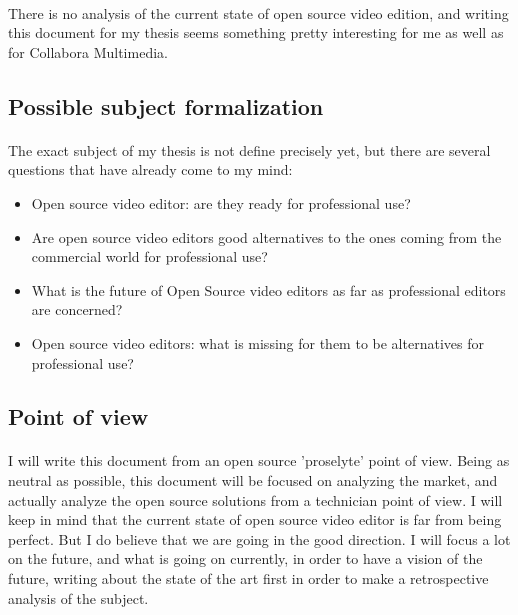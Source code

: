   \paragraph{}
    There is no analysis of the current state of open source video edition, and
    writing this document for my thesis seems something pretty interesting
    for me as well as for Collabora Multimedia.

\subsection{Possible subject formalization}
  \paragraph{}
    The exact subject of my thesis is not define precisely yet, but there are several
    questions that have already come to my mind:
    \begin{itemize}
      \item {Open source video editor: are they ready for professional use?}
      \item {Are open source video editors good alternatives to the ones
             coming from the commercial world for professional use?}
      \item {What is the future of Open Source video editors as far as
             professional editors are concerned?}
      \item {Open source video editors: what is missing for them to be
             alternatives for professional use?}
    \end{itemize}

\subsection{Point of view}
  \paragraph{}
    I will write this document from an open source 'proselyte' point of
    view. Being as neutral as possible, this document will be focused on
    analyzing the market, and actually analyze the open source solutions from
    a technician point of view. I will keep in mind that the current state
    of open source video editor is far from being perfect. But I do believe
    that we are going in the good direction. I will focus a lot on the future,
    and what is going on currently, in order to have a vision of the future,
    writing about the state of the art first in order to make a retrospective 
    analysis of the subject.

